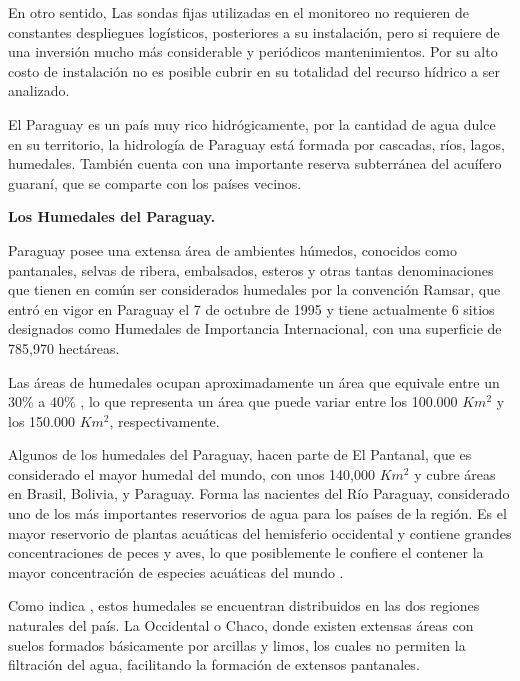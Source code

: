 En otro sentido, Las sondas fijas utilizadas en el monitoreo no requieren de constantes despliegues logísticos, posteriores a su instalación, pero si requiere de una inversi\'on mucho más considerable y periódicos mantenimientos. 
Por su alto costo de instalación no es posible cubrir en su totalidad del recurso hídrico a ser analizado. %

El Paraguay es un pa\'is muy rico hidr\'ogicamente, por la cantidad de agua dulce en su territorio, la hidrología de Paraguay está formada por cascadas, ríos, lagos,  humedales. También cuenta con una importante reserva subterránea del acuífero guaraní, que se comparte con los países vecinos.

\textbf{Los Humedales del  Paraguay.}

Paraguay posee  una extensa \'area de ambientes h\'umedos, conocidos como pantanales, selvas de ribera, embalsados, esteros y otras tantas denominaciones que tienen en com\'un ser considerados humedales por la convenci\'on Ramsar\cite{salas-duenas-2015},
que entr\'o en vigor en Paraguay el 7 de octubre de 1995 y tiene actualmente 6 sitios designados como Humedales de Importancia Internacional, con una superficie de 785,970 hectáreas.\cite{ramsarWEB}

Las \'areas de humedales ocupan aproximadamente un \'area que equivale entre un $30\%$ a $40\%$ \cite{mereles1998humedales}, lo que representa un \'area que puede variar entre los 100.000 $Km^2$ y los 150.000 $Km^2$, respectivamente.

Algunos de los humedales del Paraguay, hacen parte de El Pantanal, que es considerado el mayor humedal del mundo, con unos 140,000 $Km^2$ y cubre \'areas en Brasil, Bolivia, y Paraguay. Forma las nacientes del R\'io Paraguay, considerado uno de los m\'as importantes reservorios de agua para los pa\'ises de la regi\'on. Es el mayor reservorio de plantas acu\'aticas del hemisferio occidental y contiene grandes concentraciones de peces y aves, lo que posiblemente le confiere el contener la mayor concentraci\'on de especies acu\'aticas del mundo \cite{willink2000biological}.

Como indica \cite{vera2000iniciativas}, estos humedales se encuentran distribuidos en las dos regiones naturales del pa\'is. La Occidental o Chaco, donde existen extensas \'areas con suelos formados b\'asicamente por arcillas y limos, los cuales no permiten la filtraci\'on del agua, facilitando la formaci\'on de extensos pantanales.

